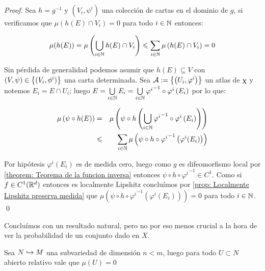 \begin{proof}
	Sea $h = g^{-1}$ y $\left(V_i, \psi^i\right)$ una colecci\'on de cartas en el dominio de $g$, si verificamos que $\mu\left(h\left(E\right) \cap V_i\right) = 0$ para todo $i \in {\mathbb{N}}$ entonces:
	
	\begin{equation*}
	\mu(h(E)) = \mu \left(\bigcup\limits_{i \in {\mathbb{N}}}{h(E) \cap V_i}\right) \leqslant \sum\limits_{i \in {\mathbb{N}}}{\mu} \left(h(E) \cap V_i\right) = 0
	\end{equation*}
	
	Sin p\'erdida de generalidad podemos asumir que $h(E) \subseteq V$ con $(V, \psi) \in \left\lbrace(V_i, \phi^i)\right\rbrace$ una carta determinada. Sea $\mathcal{A} := \left\lbrace\left(U_i, \varphi^i \right)\right\rbrace$ un atlas de $\upchi$ y notemos $E_i = E \cap U_i$; luego $E = \bigcup\limits_{i \in {\mathbb{N}}}{E_i} = \bigcup\limits_{i \in {\mathbb{N}}}{{\varphi^i}^{-1} \circ \varphi^{i} \left(E_i\right)}$ por lo que:
	
	\begin{equation*}
	\begin{aligned}
	\mu\left(\psi \circ h(E)\right) & = & \mu \left(\psi \circ h \left(\bigcup\limits_{i \in {\mathbb{N}}}{{\varphi^i}^{-1} \circ \varphi^{i} \left(E_i\right)}\right)\right)\\
	& \leqslant & \sum\limits_{i \in {\mathbb{N}}}{\mu \left(\psi \circ h \circ {\varphi^{i}}^{-1} \left(\varphi^i (E_i)\right)\right)}
	\end{aligned}
	\end{equation*}
	
	Por hip\'otesis $\varphi^i(E_i)$ es de medida cero, luego como $g$ es difeomorfismo local por \ref{theorem: Teorema de la funcion inversa}  entonces $\psi \circ h \circ {\varphi^{i}}^{-1} \in C^1$. Como si $f \in C^1({\mathbb{R}}^d)$ entonces es localmente Lipshitz conclu\'imos por \ref{prop: Localmente Lipshitz preserva medida} que ${\mu \left(\psi \circ h \circ {\varphi^{i}}^{-1} \left(\varphi^i (E_i)\right)\right)} = 0$ para todo $i \in {\mathbb{N}}$. \qed
	
\end{proof}

Conclu\'imos con un resultado natural, pero no por eso menos crucial a la hora de ver la probabilidad de un conjunto dado en $X$.

\begin{proposition}
	\label{prop: Dimension menor tiene medida 0}
	Sea $N \hookrightarrow M$ una subvariedad de dimensi\'on $n < m$, luego para todo $U \subset N$ abierto relativo vale que $\mu(U) = 0$
\end{proposition}

